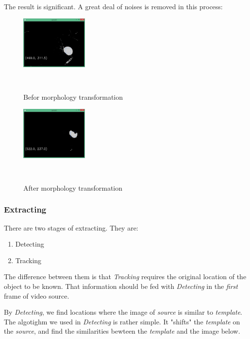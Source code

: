 The result is significant. A great deal of noises is removed in this process:\\
\begin{figure}[h!]

  \centering
    \includegraphics[width=0.3\textwidth]{../Pictures/before.png}
    \caption{Befor morphology transformation}\\
\end{figure}
\begin{figure}[h!]

  \centering
    \includegraphics[width=0.3\textwidth]{../Pictures/after.png}
    \caption{After morphology transformation}\\
\end{figure}
\newpage

\subsubsection{Extracting}
There are two stages of extracting. They are:
\begin{enumerate}
  \item Detecting
  \item Tracking
\end{enumerate}
The difference between them is that \emph{Tracking} requires the original location of the object to be known. That information should be fed with \emph{Detecting} in the \emph{first} frame of video source.

By \emph{Detecting}, we find locations where the image of \emph{source} is similar to \emph{template}.
The algotighm we used in \emph{Detecting} is rather simple. It "shifts" the \emph{template} on the \emph{source}, and find the similarities bewteen the \emph{template} and the image below.

